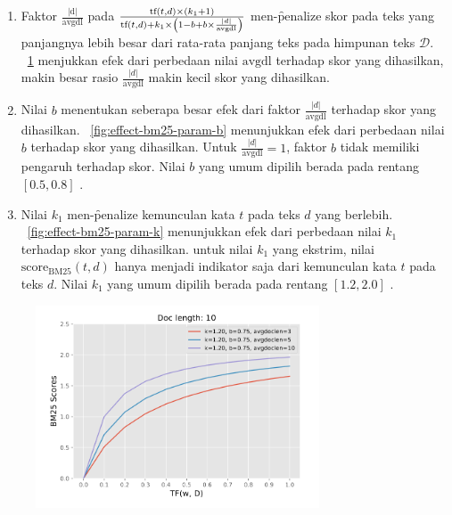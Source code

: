     \begin{enumerate}
        \item Faktor $\frac{|\text{d}|}{\text{avgdl}}$ pada $\frac{\text{tf}(t, d) \times (k_1 + 1)}{\text{tf}(t, d) + k_1 \times \left(1 - b + b \times \textcolor{black}{\frac{|d|}{\text{avgdl}}}\right)}$ men-\f{penalize} skor pada teks yang panjangnya lebih besar dari rata-rata panjang teks pada himpunan teks $\mathcal{D}$. \pic~\ref{fig:effect-bm25-long-doc} menjukkan efek dari perbedaan nilai $\text{avgdl}$ terhadap skor yang dihasilkan, makin besar rasio $\frac{|d|}{\text{avgdl}}$ makin kecil skor yang dihasilkan.
        \item Nilai $b$ menentukan seberapa besar efek dari faktor $\frac{|d|}{\text{avgdl}}$ terhadap skor yang dihasilkan. \pic~\ref{fig:effect-bm25-param-b} menunjukkan efek dari perbedaan nilai $b$ terhadap skor yang dihasilkan. Untuk $\frac{|d|}{\text{avgdl}}=1$, faktor $b$ tidak memiliki pengaruh terhadap skor. Nilai $b$ yang umum dipilih berada pada rentang $[0.5, 0.8]$ \citep{irlecture}.
        \item  Nilai $k_1$ men-\f{penalize} kemunculan kata $t$ pada teks $d$ yang berlebih. \pic~\ref{fig:effect-bm25-param-k} menunjukkan efek dari perbedaan nilai $k_1$ terhadap skor yang dihasilkan. untuk nilai $k_1$ yang ekstrim, nilai $\text{score}_{\text{BM25}}(t,d)$ hanya menjadi indikator saja dari kemunculan kata $t$ pada teks $d$. Nilai $k_1$ yang umum dipilih berada pada rentang $[1.2, 2.0]$ \citep{irlecture}.
    \end{enumerate}
    \begin{figure}
        \centering
        \includegraphics[width=0.75\textwidth]{assets/pics/effect-bm25-long-doc.png}
        \label{fig:effect-bm25-long-doc}
    \end{figure}

